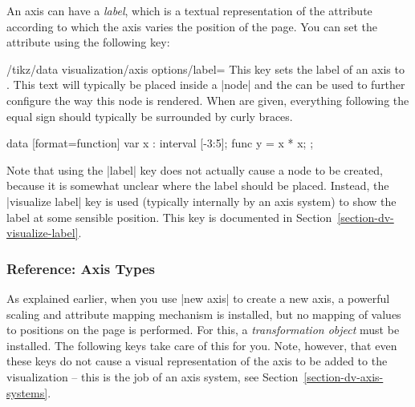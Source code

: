 An axis can have a \emph{label}, which is a textual representation of
the attribute according to which the axis varies the position of the
page. You can set the attribute using the following key:


\begin{key}{/tikz/data visualization/axis options/label=}
  This key sets the label of an axis to . This text will
  typically be placed inside a |node| and the  can be
  used to further configure the way this node is rendered. When
   are given, everything following the equal sign should
  typically be surrounded by curly braces.
\begin{codeexample}[]
\tikz \datavisualization [scientific axes,
                          x axis = {label=$x$, length=2.5cm},
                          y axis = {label={[fill=blue!20]{$x^2$}}},
                          visualize as smooth line]
 data [format=function] {
   var x : interval [-3:5];
   func y = \value x * \value x;
 };
\end{codeexample}  
\end{key}

Note that using the |label| key does not actually cause a node to be
created, because it is somewhat unclear where the label should be
placed. Instead, the |visualize label| key is used (typically
internally by an axis system) to show the label at some sensible
position. This key is documented in
Section~\ref{section-dv-visualize-label}. 



\subsubsection{Reference: Axis Types}

\label{section-dv-reference-axis-types}

As explained earlier, when you use |new axis| to create a new axis,
a powerful scaling and attribute mapping mechanism is installed, but
no mapping of values to positions on the page is performed. For this,
a \emph{transformation object} must be installed. The following keys
take care of this for you. Note, however, that even these keys do not
cause a visual representation of the axis to be added to the
visualization -- this is the job of an axis system, see
Section~\ref{section-dv-axis-systems}. 

